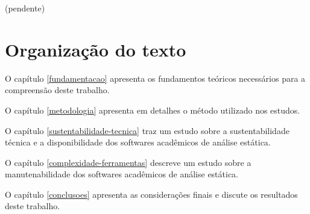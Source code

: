 (pendente)

\section{Organização do texto}

O capítulo \ref{fundamentacao} apresenta os fundamentos teóricos necessários
para a compreensão deste trabalho.

O capítulo \ref{metodologia} apresenta em detalhes o método utilizado nos
estudos.

O capítulo \ref{sustentabilidade-tecnica} traz um estudo sobre a
sustentabilidade técnica e a disponibilidade dos softwares acadêmicos de
análise estática.

O capítulo \ref{complexidade-ferramentas} descreve um estudo sobre a
manutenabilidade dos softwares acadêmicos de análise estática.

O capítulo \ref{conclusoes} apresenta as considerações finais e discute os
resultados deste trabalho.

%

